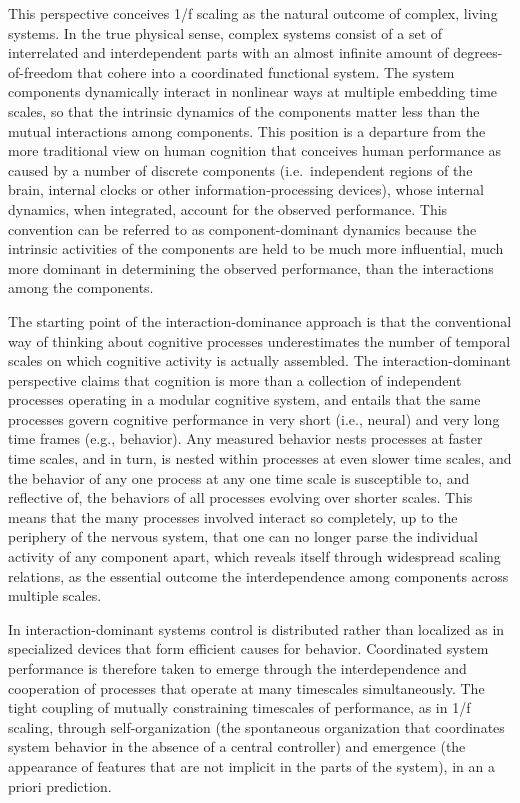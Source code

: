 \documentclass[12pt,]{book}
\begin{document}
This perspective conceives 1/f scaling as the natural outcome of complex, living systems. In the true physical sense, complex systems consist of a set of interrelated and interdependent parts with an almost infinite amount of degrees-of-freedom that cohere into a coordinated functional system. The system components dynamically interact in nonlinear ways at multiple embedding time scales, so that the intrinsic dynamics of the components matter less than the mutual interactions among components. This position is a departure from the more traditional view on human cognition that conceives human performance as caused by a number of discrete components (i.e.~independent regions of the brain, internal clocks or other information-processing devices), whose internal dynamics, when integrated, account for the observed performance. This convention can be referred to as component-dominant dynamics because the intrinsic activities of the components are held to be much more influential, much more dominant in determining the observed performance, than the interactions among the components.

The starting point of the interaction-dominance approach is that the conventional way of thinking about cognitive processes underestimates the number of temporal scales on which cognitive activity is actually assembled. The interaction-dominant perspective claims that cognition is more than a collection of independent processes operating in a modular cognitive system, and entails that the same processes govern cognitive performance in very short (i.e., neural) and very long time frames (e.g., behavior). Any measured behavior nests processes at faster time scales, and in turn, is nested within processes at even slower time scales, and the behavior of any one process at any one time scale is susceptible to, and reflective of, the behaviors of all processes evolving over shorter scales. This means that the many processes involved interact so completely, up to the periphery of the nervous system, that one can no longer parse the individual activity of any component apart, which reveals itself through widespread scaling relations, as the essential outcome the interdependence among components across multiple scales.

In interaction-dominant systems control is distributed rather than localized as in specialized devices that form efficient causes for behavior. Coordinated system performance is therefore taken to emerge through the interdependence and cooperation of processes that operate at many timescales simultaneously. The tight coupling of mutually constraining timescales of performance, as in 1/f scaling, through self-organization (the spontaneous organization that coordinates system behavior in the absence of a central controller) and emergence (the appearance of features that are not implicit in the parts of the system), in an a priori prediction.
\end{document}
